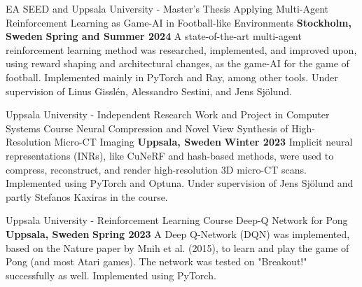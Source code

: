 

\begin{cventries}


        \cventry
        {EA SEED and Uppsala University - Master's Thesis} %
        {Applying Multi-Agent Reinforcement Learning as Game-AI in Football-like Environments} %
        {\textbf{Stockholm, Sweden}} %
        {\textbf{Spring and Summer 2024}} %
        {
            A state-of-the-art multi-agent reinforcement learning method was researched, implemented, and improved upon, using reward shaping and architectural changes, as the game-AI for the game of football. Implemented mainly in PyTorch and Ray, among other tools. Under supervision of Linus Gisslén, Alessandro Sestini, and Jens Sjölund. 
        }

        
        \cventry
        {Uppsala University - Independent Research Work and Project in Computer Systems Course} %
        {Neural Compression and Novel View Synthesis of High-Resolution Micro-CT Imaging} %
        {\textbf{Uppsala, Sweden}} %
        {\textbf{Winter 2023}} %
        {
            Implicit neural representations (INRs), like CuNeRF and hash-based methods, were used to compress, reconstruct, and render high-resolution 3D micro-CT scans. Implemented using PyTorch and Optuna. Under supervision of Jens Sjölund and partly Stefanos Kaxiras in the course.
        }
        
       \cventry
        {Uppsala University - Reinforcement Learning Course} %
        {Deep-Q Network for Pong} %
        {\textbf{Uppsala, Sweden}} %
        {\textbf{Spring 2023}} %
        {
            A Deep Q-Network (DQN) was implemented, based on the Nature paper by Mnih et al. (2015), to learn and play the game of Pong (and most Atari games). The network was tested on "Breakout!" successfully as well. Implemented using PyTorch.
        }



\end{cventries}
